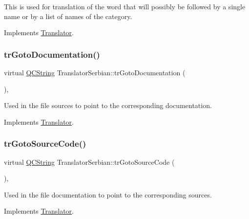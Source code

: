 This is used for translation of the word that will possibly be followed by a single name or by a list of names of the category. 

Implements \mbox{\hyperlink{class_translator}{Translator}}.

\mbox{\label{class_translator_serbian_a766043268bd3b31ec48add2438e99a8b}} 
\subsubsection{\texorpdfstring{trGotoDocumentation()}{trGotoDocumentation()}}
{\footnotesize\ttfamily virtual \mbox{\hyperlink{class_q_c_string}{Q\+C\+String}} Translator\+Serbian\+::tr\+Goto\+Documentation (\begin{DoxyParamCaption}{ }\end{DoxyParamCaption})\hspace{0.3cm}{\ttfamily [inline]}, {\ttfamily [virtual]}}

Used in the file sources to point to the corresponding documentation. 

Implements \mbox{\hyperlink{class_translator}{Translator}}.

\mbox{\label{class_translator_serbian_afae948febe9f2f505affad92e3b97028}} 
\subsubsection{\texorpdfstring{trGotoSourceCode()}{trGotoSourceCode()}}
{\footnotesize\ttfamily virtual \mbox{\hyperlink{class_q_c_string}{Q\+C\+String}} Translator\+Serbian\+::tr\+Goto\+Source\+Code (\begin{DoxyParamCaption}{ }\end{DoxyParamCaption})\hspace{0.3cm}{\ttfamily [inline]}, {\ttfamily [virtual]}}

Used in the file documentation to point to the corresponding sources. 

Implements \mbox{\hyperlink{class_translator}{Translator}}.

